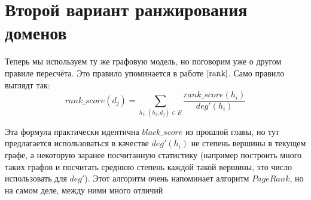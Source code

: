 \documentclass[14pt]{extreport} %
\begin{document}
\section{Второй вариант ранжирования доменов}
Теперь мы используем ту же графовую модель, но поговорим уже о другом правиле пересчёта. Это правило упоминается в работе $\cite{rank}$. Само правило выглядт так:
\begin{equation}
	\label{eq:dr2-rank}
	rank\_score(d_j) = \sum_{h_i: (h_i, d_j)\in E} \frac{rank\_score(h_i)}{deg'(h_i)}
\end{equation}
	
Эта формула практически идентична $black\_score$ из прошлой главы, но тут предлагается использоваться в качестве $deg'(h_i)$ не степень вершины в текущем графе, а некоторую заранее посчитанную статистику (например построить много таких графов и посчитать среднюю степень каждой такой вершины, это число использовать для $deg'$). Этот алгоритм очень напоминает алгоритм $PageRank$, но на самом деле, между ними много отличий
\\\\
\end{document}
